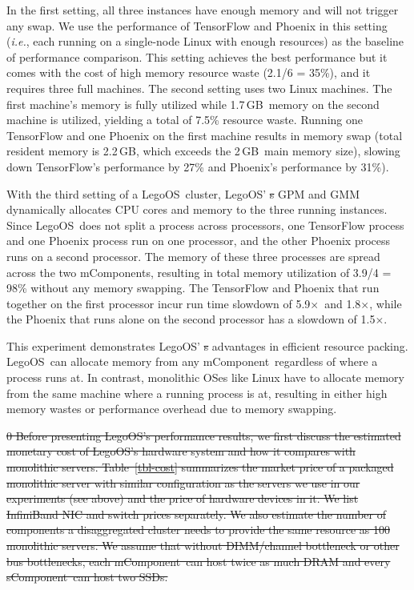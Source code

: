 \documentclass[10pt,times,twocolumn]{z2-article}
\newcommand{\x}{$\times$}
\newcommand{\ie}{\textit{i.e.}}
\newcommand{\GB}{\,GB}
\newcommand{\lego}{LegoOS}
\newcommand{\mcomponent}{mComponent}
\newcommand{\scomponent}{sComponent}
\providecommand{\DIFdeltex}[1]{{\protect\color{red}\sout{#1}}}                      %
\providecommand{\DIFdelbegin}{} %
\providecommand{\DIFdelend}{} %
\providecommand{\DIFdel}[1]{\texorpdfstring{\DIFdeltex{#1}}{}} %
\newcommand{\DIFscaledelfig}{0.5}
\newlength{\DIFdelgraphicswidth} %
\newlength{\DIFdelgraphicsheight} %
\newcommand{\DIFdelincludegraphics}[2][]{%
\sbox{\DIFdelgraphicsbox}{\DIFOincludegraphics[#1]{#2}}%
\settoboxwidth{\DIFdelgraphicswidth}{\DIFdelgraphicsbox} %
\settoboxtotalheight{\DIFdelgraphicsheight}{\DIFdelgraphicsbox} %
\scalebox{\DIFscaledelfig}{%
\parbox[b]{\DIFdelgraphicswidth}{\usebox{\DIFdelgraphicsbox}\\[-\baselineskip] \rule{\DIFdelgraphicswidth}{0em}}\llap{\resizebox{\DIFdelgraphicswidth}{\DIFdelgraphicsheight}{%
\setlength{\unitlength}{\DIFdelgraphicswidth}%
\begin{picture}(1,1)%
\thicklines\linethickness{2pt} %
{\color[rgb]{1,0,0}\put(0,0){\framebox(1,1){}}}%
{\color[rgb]{1,0,0}\put(0,0){\line( 1,1){1}}}%
{\color[rgb]{1,0,0}\put(0,1){\line(1,-1){1}}}%
\end{picture}%
}\hspace*{3pt}}} %
} %
\DeclareRobustCommand{\DIFdelbegin}{\DIFOdelbegin \let\includegraphics\DIFdelincludegraphics} %
\DeclareRobustCommand{\DIFdelend}{\DIFOaddend \let\includegraphics\DIFOincludegraphics} %
\begin{document}
{{{{{{{In the first setting, all three instances have enough memory and will not trigger any swap. 
We use the performance of TensorFlow and Phoenix in this setting (\ie, each running on a single-node Linux with enough resources)
as the baseline of performance comparison.
This setting achieves the best performance but it comes with the cost of high memory resource waste (2.1/6 = 35\%),
and it requires three full machines.
The second setting uses two Linux machines. 
The first machine's memory is fully utilized while 1.7\GB\ memory on the second machine is utilized, yielding a total of 7.5\% resource waste.
Running one TensorFlow and one Phoenix on the first machine results in memory swap (total resident memory is 2.2\GB, which exceeds the 2\GB\ main memory size),
slowing down TensorFlow's performance by 27\% and Phoenix's performance by 31\%).

With the third setting of a \lego\ cluster, \lego' \DIFdelbegin \DIFdel{s }\DIFdelend GPM and GMM dynamically allocates CPU cores and memory to 
the three running instances. 
Since \lego\ does not split a process across processors, one TensorFlow process and one Phoenix process
run on one processor, and the other Phoenix process runs on a second processor.
The memory of these three processes are spread across the two \mcomponent s,
resulting in total memory utilization of 3.9/4 = 98\% without any memory swapping.
The TensorFlow and Phoenix that run together on the first processor incur run time slowdown of 
5.9\x\ and 1.8\x, while the Phoenix that runs alone on the second processor has a slowdown of 1.5\x.
\DIFdelbegin %
\DIFdelend 

This experiment demonstrates \lego' \DIFdelbegin \DIFdel{s }\DIFdelend advantages in efficient resource packing.
\lego\ can allocate memory from any \mcomponent\ regardless of where a process runs at.
In contrast, monolithic OSes like Linux have to allocate memory from the same machine where
a running process is at, resulting in either high memory wastes or performance overhead due to memory swapping.
\DIFdelbegin %

\DIFdel{0
Before presenting \lego's performance results, we first discuss the estimated monetary cost of 
\lego's hardware system and how it compares with monolithic servers.
Table~\ref{tbl-cost} summarizes the market price of a packaged monolithic server 
with similar configuration as the servers we use in our experiments (see above)
and the price of hardware devices in it. 
We list InfiniBand NIC and switch prices separately.
We also estimate the number of components a disaggregated cluster needs to provide the same 
resource as 100 monolithic servers.
We assume that without DIMM/channel bottleneck or other bus bottlenecks, 
each \mcomponent\ can host twice as much DRAM and every \scomponent\ can host two SSDs.
}%

}}}}}}}
\end{document}
